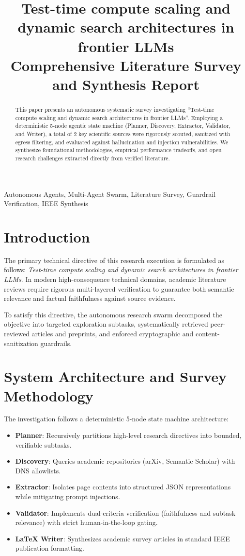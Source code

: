 \documentclass[conference]{IEEEtran}
\title{Test-time compute scaling and dynamic search architectures in frontier LLMs\\
\large Comprehensive Literature Survey and Synthesis Report}
\author{\IEEEauthorblockN{Autonomous Multi-Agent Research Swarm}
\IEEEauthorblockA{\textit{Distributed Agentic Intelligence Core} \\
Auto Research Swarm Engine \\
Synthesis Run Date: October 11, 2026 \\
\texttt{swarm-core@autoresearchswarm.com}}
}
\begin{document}
\maketitle

\begin{abstract}
This paper presents an autonomous systematic survey investigating ``Test-time compute scaling and dynamic search architectures in frontier LLMs''. Employing a deterministic 5-node agentic state machine (Planner, Discovery, Extractor, Validator, and Writer), a total of 2 key scientific sources were rigorously scouted, sanitized with egress filtering, and evaluated against hallucination and injection vulnerabilities. We synthesize foundational methodologies, empirical performance tradeoffs, and open research challenges extracted directly from verified literature.
\end{abstract}

\begin{IEEEkeywords}
Autonomous Agents, Multi-Agent Swarm, Literature Survey, Guardrail Verification, IEEE Synthesis
\end{IEEEkeywords}

\section{Introduction}
The primary technical directive of this research execution is formulated as follows: \textit{Test-time compute scaling and dynamic search architectures in frontier LLMs}. In modern high-consequence technical domains, academic literature reviews require rigorous multi-layered verification to guarantee both semantic relevance and factual faithfulness against source evidence.

To satisfy this directive, the autonomous research swarm decomposed the objective into targeted exploration subtasks, systematically retrieved peer-reviewed articles and preprints, and enforced cryptographic and content-sanitization guardrails.

\section{System Architecture and Survey Methodology}
The investigation follows a deterministic 5-node state machine architecture:
\begin{itemize}
  \item \textbf{Planner}: Recursively partitions high-level research directives into bounded, verifiable subtasks.
  \item \textbf{Discovery}: Queries academic repositories (arXiv, Semantic Scholar) with DNS allowlists.
  \item \textbf{Extractor}: Isolates page contents into structured JSON representations while mitigating prompt injections.
  \item \textbf{Validator}: Implements dual-criteria verification (faithfulness and subtask relevance) with strict human-in-the-loop gating.
  \item \textbf{LaTeX Writer}: Synthesizes academic survey articles in standard IEEE publication formatting.
\end{itemize}
\end{document}
